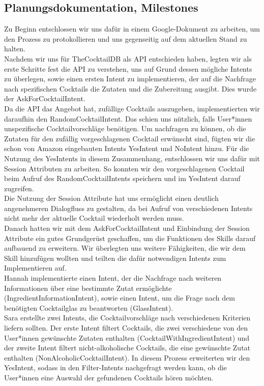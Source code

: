 \documentclass[12pt,letterpaper]{article}
\begin{document}
\subsection{Planungsdokumentation, Milestones}
Zu Beginn entschlossen wir uns dafür in einem Google-Dokument zu arbeiten, um den Prozess zu protokollieren und uns gegenseitig auf dem aktuellen Stand zu halten. \\ Nachdem wir uns für TheCocktailDB als API entschieden haben, legten wir als erste Schritte fest die API zu verstehen, uns auf Grund dessen mögliche Intents zu überlegen, sowie einen ersten Intent zu implementieren, der auf die Nachfrage nach spezifischen Cocktails die Zutaten und die Zubereitung ausgibt. Dies wurde der AskForCocktailIntent. \\
Da die API das Angebot hat, zufällige Cocktails auszugeben, implementierten wir daraufhin den RandomCocktailIntent. Das schien uns nützlich, falls User*innen unspezifische Cocktailvorschläge benötigen. Um nachfragen zu können, ob die Zutaten für den zufällig vorgeschlagenen Cocktail erwünscht sind, fügten wir die schon von Amazon eingebauten Intents YesIntent und NoIntent hinzu. Für die Nutzung des YesIntents in diesem Zusammenhang, entschlossen wir uns dafür mit Session Attributen zu arbeiten. So konnten wir den vorgeschlagenen Cocktail beim Aufruf des RandomCocktailIntents speichern und im YesIntent darauf zugreifen.\\ Die Nutzung der Session Attribute hat uns ermöglicht einen deutlich angenehmeren Dialogfluss zu gestalten, da bei Aufruf von verschiedenen Intents nicht mehr der aktuelle Cocktail wiederholt werden muss. \\
Danach hatten wir mit dem AskForCocktailIntent und Einbindung der Session Attribute ein gutes Grundgerüst geschaffen, um die Funktionen des Skills darauf aufbauend zu erweitern. Wir überlegten uns weitere Fähigkeiten, die wir dem Skill hinzufügen wollten und teilten die dafür notwendigen Intents zum Implementieren auf. \\ Hannah implementierte einen Intent, der die Nachfrage nach weiteren Informationen über eine bestimmte Zutat ermöglichte (IngredientInformationIntent), sowie einen Intent, um die Frage nach dem benötigten Cocktailglas zu beantworten (GlassIntent). \\ Sara erstellte zwei Intents, die Cocktailvorschläge nach verschiedenen Kriterien liefern sollten. Der erste Intent filtert Cocktails, die zwei verschiedene von den User*innen gewünschte Zutaten enthalten (CocktailWithIngredientIntent) und der zweite Intent filtert nicht-alkoholische Cocktails, die eine gewünschte Zutat enthalten (NonAlcoholicCocktailIntent). In diesem Prozess erweiterten wir den YesIntent, sodass in den Filter-Intents nachgefragt werden kann, ob die User*innen eine Auswahl der gefundenen Cocktails hören möchten. \\
\end{document}
